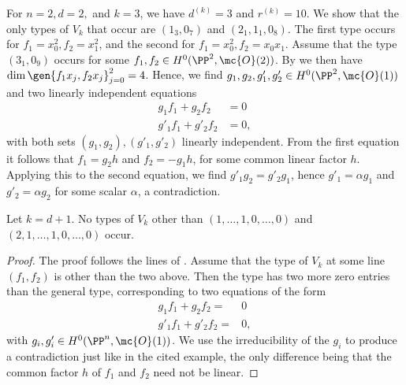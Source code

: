 \begin{example} \label{no-big-types}
	For $n=2, d=2,$ and $k=3$, we have $d^{(k)}=3$ and $r^{(k)}=10$. We show that the only types of $V_k$ that occur are $(1_3, 0_7)$ and $(2_1,1_1,0_8)$. The first type occurs \eg for $f_1 = x_0^2, f_2=x_1^2$, and the second for $f_1=x_0^2, f_2=x_0x_1$. Assume that the type $(3_1,0_9)$ occurs for some $f_1,f_2 \in H^0(\PP^2,\mc{O}(2))$. By  we then have $\dim\gen{f_1 x_j,f_2 x_j}_{j=0}^2 = 4$. Hence, we find $g_1,g_2,g'_1,g'_2\in H^0(\PP^2,\mc{O}(1))$ and two linearly independent equations
	\begin{align*}
	g_1f_1 + g_2f_2 &= 0 \\
	g'_1f_1 + g'_2f_2 &= 0,
	\end{align*}
	with both sets $(g_1,g_2), (g'_1,g'_2)$ linearly independent.
	From the first equation it follows that $f_1 = g_2 h$ and $f_2 = -g_1 h$, for some common linear factor $h$. Applying this to the second equation, we find $g'_1 g_2 = g'_2 g_1$, hence $g'_1 = \alpha g_1$ and $g'_2 = \alpha g_2$ for some scalar $\alpha$, a contradiction.
\end{example}

\begin{proposition} \label{no-big-types-general}
	Let $k=d+1$. No types of $V_k$ other than
	$(1,\dotsc,1,0,\dotsc,0)$ and $(2,1,\dotsc,1,0,\dotsc,0)$ occur. 
\end{proposition}

\begin{proof}
	The proof follows the lines of . Assume that the type of $V_k$ at some line $(f_1,f_2)$ is other than the two above. Then the type has two more zero entries than the general type, corresponding to two equations of the form
	\begin{align*}
		g_1f_1 + g_2f_2 =& 0 \\
		g'_1 f_1 + g'_2 f_2 =& 0,
	\end{align*}
	with $g_i,g'_i\in H^0(\PP^n,\mc{O}(1))$. We use the irreducibility of the $g_i$ to produce a contradiction just like in the cited example, the only difference being that the common factor $h$ of $f_1$ and $f_2$ need not be linear.
\end{proof}